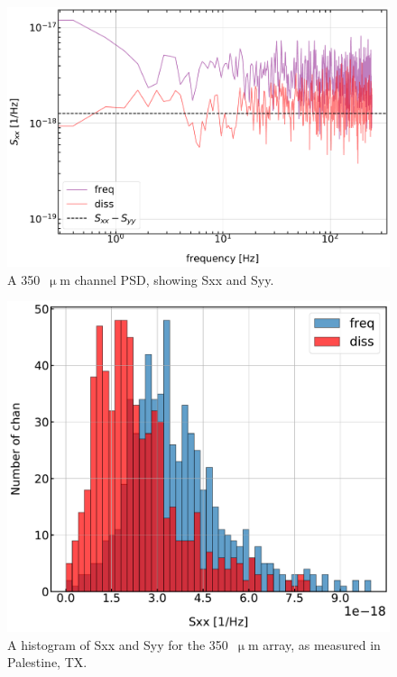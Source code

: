 \begin{figure}[!htbp]
\centering
\includegraphics[width=\textwidth]{figures/blast_data/timestreams/350_448_freq_diss_psd}
\caption[~A 350~ channel PSD, showing the phase and dissipation quadratures.]{A 350~$\upmu$m channel PSD, showing \gls{Sxx} and \gls{Syy}.}
\label{fig:350 chan 448 psd}
\end{figure}

\begin{figure}[!htbp]
\centering
\includegraphics[width=\textwidth]{figures/blast_data/timestreams/350_pal_Sxx_hist_448}
\caption[~A histogram of frequency and dissipation noise for the 350~ array, as measured in Palestine, TX.]{A histogram of \gls{Sxx} and \gls{Syy} for the 350~$\upmu$m array, as measured in Palestine, TX.}
\label{fig:350 freq diss}
\end{figure}

